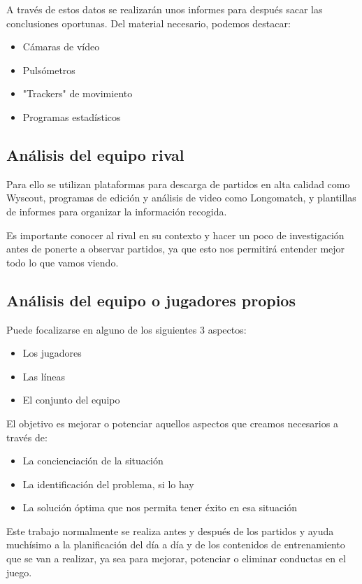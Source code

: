 A través de estos datos se realizarán unos informes para después sacar las 
conclusiones oportunas. Del material necesario, podemos destacar:

\begin{itemize}
    \item Cámaras de vídeo
    \item Pulsómetros
    \item "Trackers" de movimiento
    \item Programas estadísticos
\end{itemize}

\subsection{Análisis del equipo rival}

Para ello se utilizan plataformas para descarga de partidos en alta 
calidad como Wyscout, programas de edición y análisis de video como 
Longomatch, y plantillas de informes para organizar la información recogida.

Es importante conocer al rival en su contexto y hacer un poco de investigación antes 
de ponerte a observar partidos, ya que esto nos permitirá entender 
mejor todo lo que vamos viendo.

\subsection{Análisis del equipo o jugadores propios}
Puede focalizarse en alguno de los siguientes 3 aspectos:

\begin{itemize}
    \item Los jugadores
    \item Las líneas
    \item El conjunto del equipo
\end{itemize}

El objetivo es mejorar o potenciar aquellos aspectos que creamos necesarios 
a través de:

\begin{itemize}
    \item La concienciación de la situación
    \item La identificación del problema, si lo hay
    \item La solución óptima que nos permita tener éxito en esa situación
\end{itemize}

Este trabajo normalmente se realiza antes y después de los partidos y 
ayuda muchísimo a la planificación del día a día y de los contenidos 
de entrenamiento que se van a realizar, ya sea para mejorar, potenciar 
o eliminar conductas en el juego.

